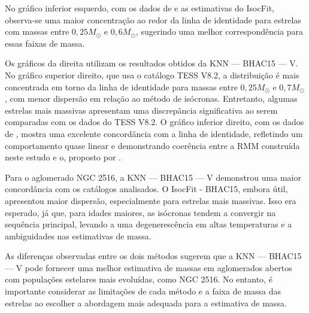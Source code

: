     No gráfico inferior esquerdo, com os dados de  e as estimativas do IsocFit, observa-se uma maior concentração ao redor da linha de identidade para estrelas com massas entre \(0,25 M_\odot\) e \(0,6 M_\odot\), sugerindo uma melhor correspondência para essas faixas de massa.
    
    Os gráficos da direita utilizam os resultados obtidos da KNN — BHAC15 — V. No gráfico superior direito, que usa o catálogo TESS V8.2, a distribuição é mais concentrada em torno da linha de identidade para massas entre \(0,25 M_\odot\) e \(0,7 M_\odot\), com menor dispersão em relação ao método de isócronas. Entretanto, algumas estrelas mais massivas apresentam uma discrepância significativa ao serem comparadas com os dados do TESS V8.2. O gráfico inferior direito, com os dados de , mostra uma excelente concordância com a linha de identidade, refletindo um comportamento quase linear e demonstrando coerência entre a RMM construída neste estudo e o, proposto por .
    
    
    
    Para o aglomerado NGC 2516, a KNN — BHAC15 — V demonstrou uma maior concordância com os catálogos analisados. O IsocFit - BHAC15, embora útil, apresentou maior dispersão, especialmente para estrelas mais massivas. Isso era esperado, já que, para idades maiores, as isócronas tendem a convergir na sequência principal, levando a uma degenerescência em altas temperaturas e a ambiguidades nas estimativas de massa.
    
    As diferenças observadas entre os dois métodos sugerem que a KNN — BHAC15 — V pode fornecer uma melhor estimativa de massas em aglomerados abertos com populações estelares mais evoluídas, como NGC 2516. No entanto, é importante considerar as limitações de cada método e a faixa de massa das estrelas ao escolher a abordagem mais adequada para a estimativa de massa.
